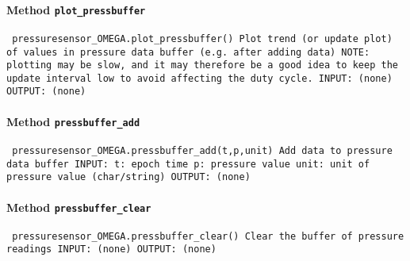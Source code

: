 \paragraph{Method \texttt{plot_pressbuffer}}
\vspace{1ex}
\texttt{\newline
pressuresensor_OMEGA.plot_pressbuffer()\newline
\newline
Plot trend (or update plot) of values in pressure data buffer (e.g. after adding data)\newline
NOTE: plotting may be slow, and it may therefore be a good idea to keep the update interval low to avoid affecting the duty cycle.\newline
\newline
INPUT:\newline
(none)\newline
\newline
OUTPUT:\newline
(none)\newline
\newline
}

\paragraph{Method \texttt{pressbuffer_add}}
\vspace{1ex}
\texttt{\newline
pressuresensor_OMEGA.pressbuffer_add(t,p,unit)\newline
\newline
Add data to pressure data buffer\newline
\newline
INPUT:\newline
t: epoch time\newline
p: pressure value\newline
unit: unit of pressure value (char/string)\newline
\newline
OUTPUT:\newline
(none)\newline
\newline
}

\paragraph{Method \texttt{pressbuffer_clear}}
\vspace{1ex}
\texttt{\newline
pressuresensor_OMEGA.pressbuffer_clear()\newline
\newline
Clear the buffer of pressure readings\newline
\newline
INPUT:\newline
(none)\newline
\newline
OUTPUT:\newline
(none)\newline
\newline
}

